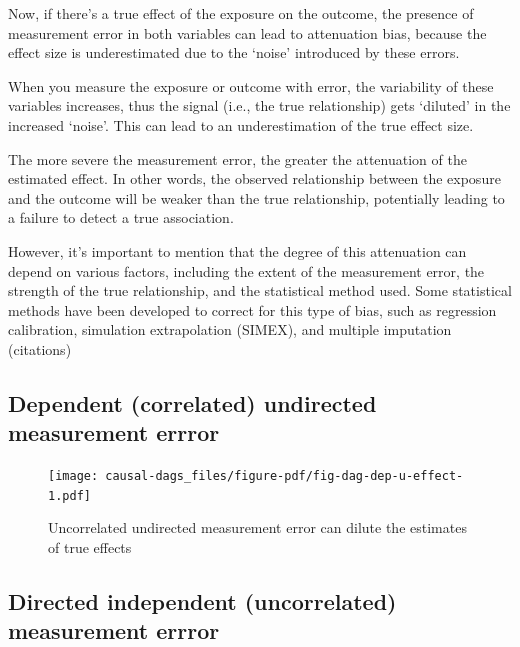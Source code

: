 \documentclass[
  singlecolumn]{report}
\begin{document}
Now, if there's a true effect of the exposure on the outcome, the
presence of measurement error in both variables can lead to attenuation
bias, because the effect size is underestimated due to the `noise'
introduced by these errors.

When you measure the exposure or outcome with error, the variability of
these variables increases, thus the signal (i.e., the true relationship)
gets `diluted' in the increased `noise'. This can lead to an
underestimation of the true effect size.

The more severe the measurement error, the greater the attenuation of
the estimated effect. In other words, the observed relationship between
the exposure and the outcome will be weaker than the true relationship,
potentially leading to a failure to detect a true association.

However, it's important to mention that the degree of this attenuation
can depend on various factors, including the extent of the measurement
error, the strength of the true relationship, and the statistical method
used. Some statistical methods have been developed to correct for this
type of bias, such as regression calibration, simulation extrapolation
(SIMEX), and multiple imputation (citations)

\hypertarget{dependent-correlated-undirected-measurement-errror}{%
\subsection{Dependent (correlated) undirected measurement
errror}\label{dependent-correlated-undirected-measurement-errror}}

\begin{figure}

{\centering \texttt{[image: causal-dags\_files/figure-pdf/fig-dag-dep-u-effect-1.pdf]}

}

\caption{\label{fig-dag-dep-u-effect}Uncorrelated undirected measurement
error can dilute the estimates of true effects}

\end{figure}

\hypertarget{directed-independent-uncorrelated-measurement-errror}{%
\subsection{Directed independent (uncorrelated) measurement
errror}\label{directed-independent-uncorrelated-measurement-errror}}
\end{document}
